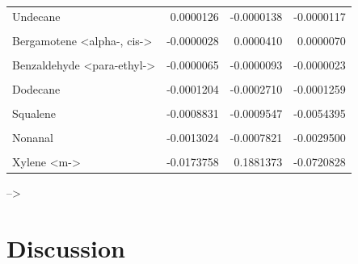 \documentclass{ufdissertation}[overrideChapters] %
\begin{document}
{\begin{table}
{\begin{tabular}[t]{lrrr}
Undecane & 0.0000126 & -0.0000138 & -0.0000117\\
\cellcolor{gray!6}{Limonene oxide, trans-} & \cellcolor{gray!6}{0.0000065} & \cellcolor{gray!6}{-0.0000065} & \cellcolor{gray!6}{-0.0000158}\\
Bergamotene <alpha-, cis-> & -0.0000028 & 0.0000410 & 0.0000070\\
\addlinespace
\cellcolor{gray!6}{Terpineol <alpha->} & \cellcolor{gray!6}{-0.0000035} & \cellcolor{gray!6}{-0.0000009} & \cellcolor{gray!6}{-0.0000102}\\
Benzaldehyde <para-ethyl-> & -0.0000065 & -0.0000093 & -0.0000023\\
\cellcolor{gray!6}{Hexadecane, 1-bromo-} & \cellcolor{gray!6}{-0.0000287} & \cellcolor{gray!6}{-0.0000616} & \cellcolor{gray!6}{-0.0000215}\\
Dodecane & -0.0001204 & -0.0002710 & -0.0001259\\
\cellcolor{gray!6}{Pentadecane} & \cellcolor{gray!6}{-0.0001940} & \cellcolor{gray!6}{0.0002776} & \cellcolor{gray!6}{0.0002476}\\
\addlinespace
Squalene & -0.0008831 & -0.0009547 & -0.0054395\\
\cellcolor{gray!6}{p-Cymene} & \cellcolor{gray!6}{-0.0012868} & \cellcolor{gray!6}{0.0008397} & \cellcolor{gray!6}{0.0021706}\\
Nonanal & -0.0013024 & -0.0007821 & -0.0029500\\
\cellcolor{gray!6}{Sulindac sulfide} & \cellcolor{gray!6}{-0.0014697} & \cellcolor{gray!6}{0.0011056} & \cellcolor{gray!6}{-0.0001368}\\
Xylene <m-> & -0.0173758 & 0.1881373 & -0.0720828\\
\bottomrule
\end{tabular}}
\end{table}
--\textgreater{}

\hypertarget{discussion-1}{%
\section{Discussion}\label{discussion-1}}

}
\end{document}
